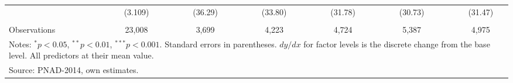 \documentclass[a4paper, 12pt]{article}
\begin{document}
\begin{table}[htbp]
\begin{adjustbox}{max width=\textwidth}
\begin{tabular}{lllllllllllll}
          &       & \multicolumn{1}{c}{(3.109)} &       & \multicolumn{1}{c}{(36.29)} &       & \multicolumn{1}{c}{(33.80)} &       & \multicolumn{1}{c}{(31.78)} &       & \multicolumn{1}{c}{(30.73)} &       & \multicolumn{1}{c}{(31.47)} \\
          &       & \multicolumn{1}{c}{} &       & \multicolumn{1}{c}{} &       & \multicolumn{1}{c}{} &       & \multicolumn{1}{c}{} &       & \multicolumn{1}{c}{} &       & \multicolumn{1}{c}{} \\
    Observations &       & \multicolumn{1}{c}{23,008} &       & \multicolumn{1}{c}{3,699} &       & \multicolumn{1}{c}{4,223} &       & \multicolumn{1}{c}{4,724} &       & \multicolumn{1}{c}{5,387} &       & \multicolumn{1}{c}{4,975} \\
    \midrule
    \multicolumn{13}{p{63.685em}}{Notes: $^{*}p<0.05$, $^{**}p<0.01$, $^{***}p<0.001$. Standard errors in parentheses. $dy/dx$ for factor levels is the discrete change from the base level. All predictors at their mean value.} \\
    \multicolumn{6}{l}{Source: PNAD-2014, own estimates.} \\
    \end{tabular}%
  \label{tab:Dropout}%
  \end{adjustbox}
\end{table}%
\end{document}
